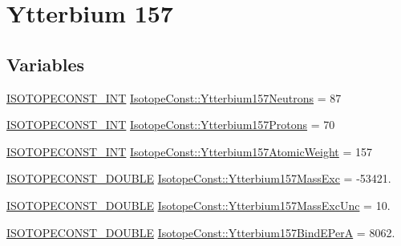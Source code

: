 \hypertarget{group___isotope_const-_ytterbium-_yb157}{}\section{Ytterbium 157}
\label{group___isotope_const-_ytterbium-_yb157}
\subsection*{Variables}
\begin{DoxyCompactItemize}
\item 
\mbox{\hyperlink{group___isotope_const-_macros_ga5f18360b3e99483a35c32d789e62621c}{I\+S\+O\+T\+O\+P\+E\+C\+O\+N\+S\+T\+\_\+\+I\+NT}} \mbox{\hyperlink{group___isotope_const-_ytterbium-_yb157_ga8e973675168eff402c9f123e35505033}{Isotope\+Const\+::\+Ytterbium157\+Neutrons}} = 87
\item 
\mbox{\hyperlink{group___isotope_const-_macros_ga5f18360b3e99483a35c32d789e62621c}{I\+S\+O\+T\+O\+P\+E\+C\+O\+N\+S\+T\+\_\+\+I\+NT}} \mbox{\hyperlink{group___isotope_const-_ytterbium-_yb157_ga85c7cca72b2035565322da9c07930e69}{Isotope\+Const\+::\+Ytterbium157\+Protons}} = 70
\item 
\mbox{\hyperlink{group___isotope_const-_macros_ga5f18360b3e99483a35c32d789e62621c}{I\+S\+O\+T\+O\+P\+E\+C\+O\+N\+S\+T\+\_\+\+I\+NT}} \mbox{\hyperlink{group___isotope_const-_ytterbium-_yb157_ga4ee778fd06a8027f21bcb18bea9652a5}{Isotope\+Const\+::\+Ytterbium157\+Atomic\+Weight}} = 157
\item 
\mbox{\hyperlink{group___isotope_const-_macros_ga8f45a7272ce02c0b4c65c44636ed719a}{I\+S\+O\+T\+O\+P\+E\+C\+O\+N\+S\+T\+\_\+\+D\+O\+U\+B\+LE}} \mbox{\hyperlink{group___isotope_const-_ytterbium-_yb157_gae28623e6601f98c30a8a1ec109935962}{Isotope\+Const\+::\+Ytterbium157\+Mass\+Exc}} = -\/53421.
\item 
\mbox{\hyperlink{group___isotope_const-_macros_ga8f45a7272ce02c0b4c65c44636ed719a}{I\+S\+O\+T\+O\+P\+E\+C\+O\+N\+S\+T\+\_\+\+D\+O\+U\+B\+LE}} \mbox{\hyperlink{group___isotope_const-_ytterbium-_yb157_ga549d19d935f7a63835fb110dc9fd4c05}{Isotope\+Const\+::\+Ytterbium157\+Mass\+Exc\+Unc}} = 10.
\item 
\mbox{\hyperlink{group___isotope_const-_macros_ga8f45a7272ce02c0b4c65c44636ed719a}{I\+S\+O\+T\+O\+P\+E\+C\+O\+N\+S\+T\+\_\+\+D\+O\+U\+B\+LE}} \mbox{\hyperlink{group___isotope_const-_ytterbium-_yb157_ga64069e1ee23f096f95eccc0d86682cbd}{Isotope\+Const\+::\+Ytterbium157\+Bind\+E\+PerA}} = 8062.
\item 

\end{DoxyCompactItemize}
